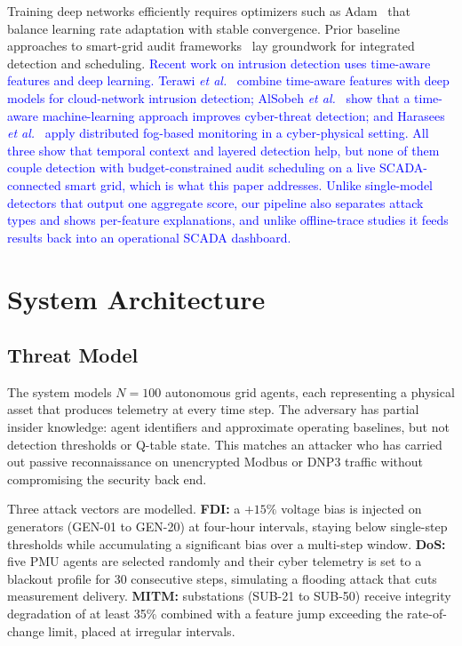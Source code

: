 \documentclass[conference,a4paper]{IEEEtran}
\begin{document}
Training deep networks efficiently requires optimizers such as Adam~\cite{b16} that balance learning rate adaptation with stable convergence. Prior baseline approaches to smart-grid audit frameworks~\cite{b17} lay groundwork for integrated detection and scheduling. \textcolor{blue}{Recent work on intrusion detection uses time-aware features and deep learning.} \textcolor{blue}{Terawi \textit{et al.}~\cite{b18} combine time-aware features with deep models for cloud-network intrusion detection; AlSobeh \textit{et al.}~\cite{b19} show that a time-aware machine-learning approach improves cyber-threat detection; and Harasees \textit{et al.}~\cite{b20} apply distributed fog-based monitoring in a cyber-physical setting. All three show that temporal context and layered detection help, but none of them couple detection with budget-constrained audit scheduling on a live SCADA-connected smart grid, which is what this paper addresses. Unlike single-model detectors that output one aggregate score, our pipeline also separates attack types and shows per-feature explanations, and unlike offline-trace studies it feeds results back into an operational SCADA dashboard.}

\section{System Architecture}

\subsection{Threat Model}

The system models $N=100$ autonomous grid agents, each representing a physical asset that produces telemetry at every time step. The adversary has partial insider knowledge: agent identifiers and approximate operating baselines, but not detection thresholds or Q-table state. This matches an attacker who has carried out passive reconnaissance on unencrypted Modbus or DNP3 traffic without compromising the security back end.

Three attack vectors are modelled. \textbf{FDI:} a $+15\%$ voltage bias is injected on generators (GEN-01 to GEN-20) at four-hour intervals, staying below single-step thresholds while accumulating a significant bias over a multi-step window. \textbf{DoS:} five PMU agents are selected randomly and their cyber telemetry is set to a blackout profile for 30 consecutive steps, simulating a flooding attack that cuts measurement delivery. \textbf{MITM:} substations (SUB-21 to SUB-50) receive integrity degradation of at least 35\% combined with a feature jump exceeding the rate-of-change limit, placed at irregular intervals.
\end{document}
